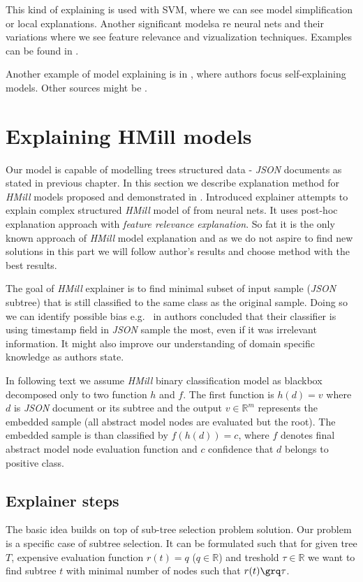 This kind of explaining is used with SVM, where we can see model simplification or local explanations. Another significant modelsa re neural nets and their variations where we see feature relevance and vizualization techniques. Examples can be found in \cite{Arrieta2019}.

Another example of model explaining is in \cite{Alvarez-Melis2018}, where authors focus self-explaining models. Other sources might be \cite{Strumbelj2013,Robnik-Sikonja2008,Montavon2018}.


\section{Explaining HMill models}
Our model is capable of modelling trees structured data - \emph{JSON} documents as stated in previous chapter. In this section we describe explanation method for \emph{HMill} models proposed and demonstrated in \cite{Pevny2020}. Introduced explainer attempts to explain complex structured \emph{HMill} model of from neural nets. It uses post-hoc explanation approach with \emph{feature relevance explanation}. So fat it is the only known approach of \emph{HMill} model explanation and as we do not aspire to find new solutions in this part we will follow author's results and choose method with the best results.

The goal of \emph{HMill} explainer is to find minimal subset of input sample (\emph{JSON} subtree) that is still classified to the same class as the original sample. Doing so we can identify possible bias e.g. \ in \cite{Pevny2020} authors concluded that their classifier is using timestamp field in \emph{JSON} sample the most, even if it was irrelevant information. It might also improve our understanding of domain specific knowledge as authors state.

In following text we assume \emph{HMill} binary classification model as blackbox decomposed only to two function $h$ and $f$. The first function is $h(d)=v$ where $d$ is \emph{JSON} document or its subtree and the output $v\in\mathbb{R}^{m}$ represents the embedded sample (all abstract model nodes are evaluated but the root). The embedded sample is than classified by $f(h(d))=c$, where $f$ denotes final abstract model node evaluation function and $c$ confidence that $d$ belongs to positive class.

\subsection{Explainer steps}
The basic idea builds on top of sub-tree selection problem solution. Our problem is a specific case of subtree selection. It can be formulated such that for given tree $T$, expensive evaluation function $r(t)=q$ ($q\in\mathbb{R}$) and treshold $\tau\in\mathbb{R}$ we want to find subtree $t$ with minimal number of nodes such that $r(t)\grq\tau$. 

